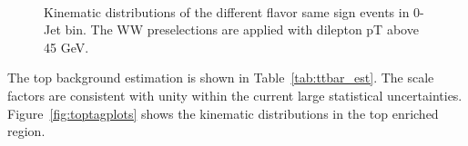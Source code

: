 \begin{figure}[!hbtp]
{}
\\

\caption{Kinematic distributions of the different flavor same sign events in 0-Jet bin. 
The WW preselections are applied with dilepton pT above 45 GeV. }
\label{fig:ssplots}
\end{figure}

The top background estimation is shown in Table~\ref{tab:ttbar_est}. 
The scale factors are consistent with unity within 
the current large statistical uncertainties. 
Figure~\ref{fig:toptagplots} shows the kinematic distributions in the top enriched 
region. 

